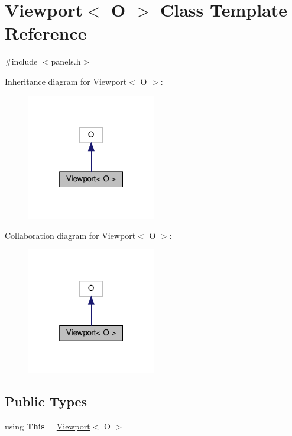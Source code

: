 \hypertarget{classViewport}{}\section{Viewport$<$ O $>$ Class Template Reference}
\label{classViewport}


{\ttfamily \#include $<$panels.\+h$>$}



Inheritance diagram for Viewport$<$ O $>$\+:\nopagebreak
\begin{figure}[H]
\begin{center}
\leavevmode
\includegraphics[width=160pt]{classViewport__inherit__graph}
\end{center}
\end{figure}


Collaboration diagram for Viewport$<$ O $>$\+:\nopagebreak
\begin{figure}[H]
\begin{center}
\leavevmode
\includegraphics[width=160pt]{classViewport__coll__graph}
\end{center}
\end{figure}
\subsection*{Public Types}
\begin{DoxyCompactItemize}
\item 
\mbox{\label{classViewport_ae2be70e231756012644499212454b87c}} 
using {\bfseries This} = \hyperlink{classViewport}{Viewport}$<$ O $>$
\end{DoxyCompactItemize}
